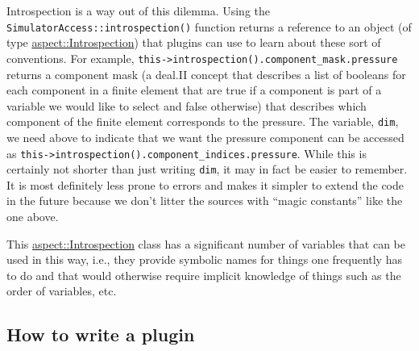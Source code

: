 \documentclass{article}
\begin{document}
Introspection is a way out of this dilemma. Using the \texttt{SimulatorAccess::introspection()}
function returns a reference to an object (of type
\href{doc/doxygen/structaspect_1_1Introspection.html}{aspect::Introspection})
that plugins can use to learn about these sort of conventions. For example,
\texttt{this->introspection().component\_mask.pressure} returns a
component mask (a deal.II concept that describes a list of booleans for each
component in a finite element that
are true if a component is part of a variable we would like to select and
false otherwise) that describes which component of the finite element
corresponds to the pressure. The variable, \texttt{dim}, we need above
to indicate that we want the pressure component can be accessed
as \texttt{this->introspection().component\_indices.pressure}. While this
is certainly not shorter than just writing \texttt{dim}, it may in
fact be easier to remember. It is most definitely less prone to
errors and makes it simpler to extend the code in the future because
we don't litter the sources with ``magic constants'' like the one
above.

This \href{doc/doxygen/structaspect_1_1Introspection.html}{aspect::Introspection} class
has a significant number of variables that can be used in this way, i.e.,
they provide symbolic names for things one frequently has to do and
that would otherwise require implicit knowledge of things such as the
order of variables, etc.


\subsection{How to write a plugin}
\label{sec:write-plugin}
\end{document}
